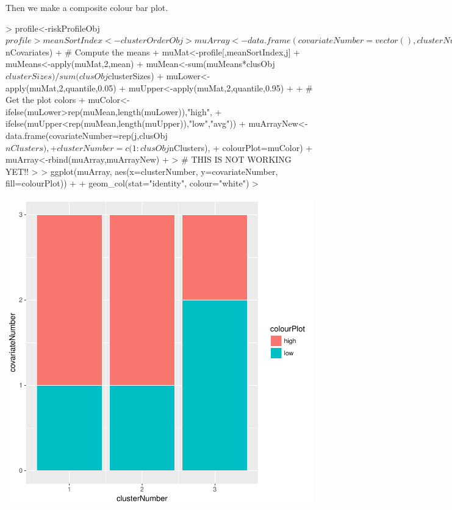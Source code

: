 \documentclass{article}
\begin{document}
Then we make a composite colour bar plot. 
\begin{Schunk}
\begin{Sinput}
> profile<-riskProfileObj$profile
> meanSortIndex<-clusterOrderObj
> muArray<-data.frame(covariateNumber=vector(),clusterNumber=vector(),
+                     colourPlot=vector())
> for(j in 1:runInfoObj$nCovariates){
+   # Compute the means
+   muMat<-profile[,meanSortIndex,j]
+   muMeans<-apply(muMat,2,mean)
+   muMean<-sum(muMeans*clusObj$clusterSizes)/sum(clusObj$clusterSizes)
+   muLower<-apply(muMat,2,quantile,0.05)
+   muUpper<-apply(muMat,2,quantile,0.95)
+ 
+     # Get the plot colors
+   muColor<-ifelse(muLower>rep(muMean,length(muLower)),"high",
+                 ifelse(muUpper<rep(muMean,length(muUpper)),"low","avg"))
+   muArrayNew<-data.frame(covariateNumber=rep(j,clusObj$nClusters),
+                          clusterNumber=c(1:clusObj$nClusters),
+                          colourPlot=muColor)
+   muArray<-rbind(muArray,muArrayNew)  
+ }
> # THIS IS NOT WORKING YET!!
> 
> ggplot(muArray, aes(x=clusterNumber, y=covariateNumber, fill=colourPlot)) +
+   geom_col(stat="identity", colour="white") 
> 
\end{Sinput}
\end{Schunk}
\includegraphics{Fig-test1}

\end{document}
